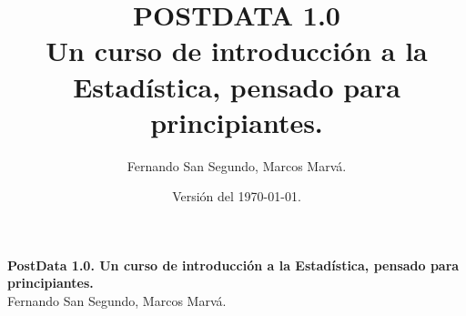 \documentclass[10pt,a4paper]{book}
\begin{document}
\frontmatter

\author{Fernando San Segundo, Marcos Marvá.}
\title{
\textcolor{\iftoggle{color}{blue}{black}}{\Huge POSTDATA 1.0}\\[5mm]
{\small Un curso de introducción a la Estadística, pensado para principiantes.}
}
\date{\small Versión del \today.}

\VerbatimFootnotes

\maketitle

\newpage

\thispagestyle{empty}

\small
\noindent \textbf{PostData 1.0. Un curso de introducción a la Estadística, pensado para principiantes. } \\
Fernando San Segundo, Marcos Marvá.
\end{document}
